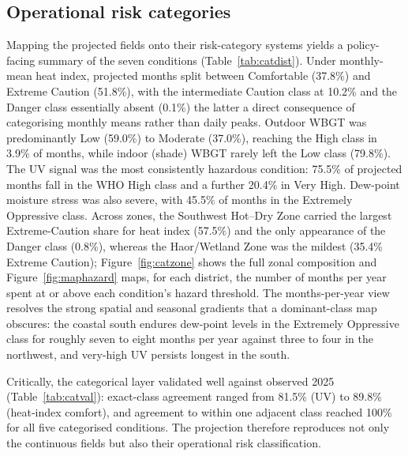 \documentclass[review,11pt]{elsarticle}
\begin{document}
\subsection{Operational risk categories}\label{sec:res-categories}
Mapping the projected fields onto their risk-category systems yields a
policy-facing summary of the seven conditions (Table~\ref{tab:catdist}). Under
monthly-mean heat index, projected months split between Comfortable (37.8\%) and
Extreme Caution (51.8\%), with the intermediate Caution class at 10.2\% and the
Danger class essentially absent (0.1\%) the latter a direct consequence of
categorising monthly means rather than daily peaks. Outdoor WBGT was
predominantly Low (59.0\%) to Moderate (37.0\%), reaching the High class in
3.9\% of months, while indoor (shade) WBGT rarely left the Low class (79.8\%).
The UV signal was the most consistently hazardous condition: 75.5\% of projected
months fall in the WHO High class and a further 20.4\% in Very High. Dew-point
moisture stress was also severe, with 45.5\% of months in the Extremely
Oppressive class. Across zones, the Southwest Hot--Dry Zone carried the largest
Extreme-Caution share for heat index (57.5\%) and the only appearance of the
Danger class (0.8\%), whereas the Haor/Wetland Zone was the mildest (35.4\%
Extreme Caution); Figure~\ref{fig:catzone} shows the full zonal composition and
Figure~\ref{fig:maphazard} maps, for each district, the number of months per year
spent at or above each condition's hazard threshold. The months-per-year view
resolves the strong spatial and seasonal gradients that a dominant-class map
obscures: the coastal south endures dew-point levels in the Extremely Oppressive
class for roughly seven to eight months per year against three to four in the
northwest, and very-high UV persists longest in the south.

Critically, the categorical layer validated well against observed 2025
(Table~\ref{tab:catval}): exact-class agreement ranged from 81.5\% (UV) to
89.8\% (heat-index comfort), and agreement to within one adjacent class reached
100\% for all five categorised conditions. The projection therefore reproduces
not only the continuous fields but also their operational risk classification.

\begin{table}[htbp]
\centering
\caption{Projected risk-category distribution (share of projected
district-months, 2025--2026, 64 districts). Only populated categories are shown.}
\label{tab:catdist}

\end{table}
\end{document}
